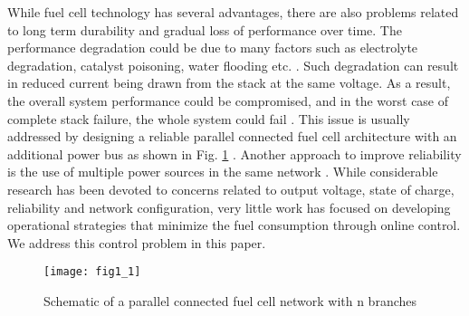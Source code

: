 \documentclass[twocolumn]{autart}
\begin{document}
While fuel cell technology has several advantages, there are also problems related to long term durability and gradual loss of performance over time. The performance degradation could be due to many factors such as electrolyte degradation, catalyst poisoning, water flooding etc. \cite{carrette2001fuel,handbook2004eg}. Such degradation can result in reduced current being drawn from the stack at the same voltage. As a result, the overall system performance could be compromised, and in the worst case of complete stack failure, the whole system could fail \cite{handbook2004eg}. This issue is usually addressed by designing a reliable parallel connected fuel cell architecture with an additional power bus as shown in Fig. \ref{fuelcellconfig} \cite{michalskeparallel:10}. Another approach to improve reliability is the use of multiple power sources in the same network \cite{jiang2003strategy,jiang2007adaptive}. While considerable research has been devoted to concerns related to output voltage, state of charge, reliability and network configuration, very little work has focused on developing operational strategies that minimize the fuel consumption through online control. We address this control problem in this paper.  
\begin{figure}[htbp]
\centering
\texttt{[image: fig1\_1]}
\caption{Schematic of a parallel connected fuel cell network with n branches}
\label{fuelcellconfig}
\end{figure}
\end{document}
